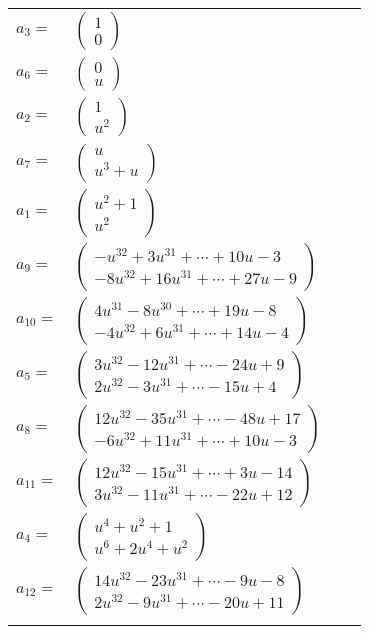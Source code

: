 \documentclass[1p]{elsarticle_modified}
\theoremstyle{definition}
\begin{document}
\begin{tabular}{m{7pt} m{180pt} m{7pt} m{180pt} }
\flushright $a_{3}=$&$\begin{pmatrix}1\\0\end{pmatrix}$ \\
\flushright $a_{6}=$&$\begin{pmatrix}0\\u\end{pmatrix}$ \\
\flushright $a_{2}=$&$\begin{pmatrix}1\\u^2\end{pmatrix}$ \\
\flushright $a_{7}=$&$\begin{pmatrix}u\\u^3+u\end{pmatrix}$ \\
\flushright $a_{1}=$&$\begin{pmatrix}u^2+1\\u^2\end{pmatrix}$ \\
\flushright $a_{9}=$&$\begin{pmatrix}- u^{32}+3 u^{31}+\cdots+10 u-3\\-8 u^{32}+16 u^{31}+\cdots+27 u-9\end{pmatrix}$ \\
\flushright $a_{10}=$&$\begin{pmatrix}4 u^{31}-8 u^{30}+\cdots+19 u-8\\-4 u^{32}+6 u^{31}+\cdots+14 u-4\end{pmatrix}$ \\
\flushright $a_{5}=$&$\begin{pmatrix}3 u^{32}-12 u^{31}+\cdots-24 u+9\\2 u^{32}-3 u^{31}+\cdots-15 u+4\end{pmatrix}$ \\
\flushright $a_{8}=$&$\begin{pmatrix}12 u^{32}-35 u^{31}+\cdots-48 u+17\\-6 u^{32}+11 u^{31}+\cdots+10 u-3\end{pmatrix}$ \\
\flushright $a_{11}=$&$\begin{pmatrix}12 u^{32}-15 u^{31}+\cdots+3 u-14\\3 u^{32}-11 u^{31}+\cdots-22 u+12\end{pmatrix}$ \\
\flushright $a_{4}=$&$\begin{pmatrix}u^4+u^2+1\\u^6+2 u^4+u^2\end{pmatrix}$ \\
\flushright $a_{12}=$&$\begin{pmatrix}14 u^{32}-23 u^{31}+\cdots-9 u-8\\2 u^{32}-9 u^{31}+\cdots-20 u+11\end{pmatrix}$\\&\end{tabular}
\end{document}
